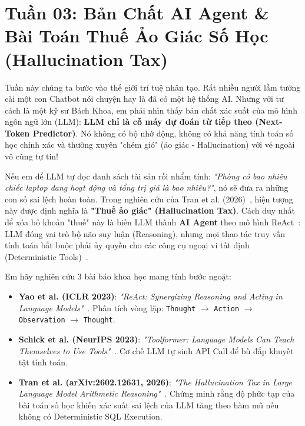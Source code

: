 ﻿\section{Tuần 03: Bản Chất AI Agent \& Bài Toán Thuế Ảo Giác Số Học (Hallucination Tax)}
\label{sec:tuan_03}

\begin{advisorbox}
Tuần này chúng ta bước vào thế giới trí tuệ nhân tạo. Rất nhiều người lầm tưởng cài một con Chatbot nói chuyện hay là đã có một hệ thống AI. Nhưng với tư cách là một kỹ sư Bách Khoa, em phải nhìn thấy bản chất xác suất của mô hình ngôn ngữ lớn (LLM): \textbf{LLM chỉ là cỗ máy dự đoán từ tiếp theo (Next-Token Predictor)}. Nó không có bộ nhớ động, không có khả năng tính toán số học chính xác và thường xuyên "chém gió" (ảo giác - Hallucination) với vẻ ngoài vô cùng tự tin!

Nếu em để LLM tự đọc danh sách tài sản rồi nhẩm tính: \textit{"Phòng có bao nhiêu chiếc laptop đang hoạt động và tổng trị giá là bao nhiêu?"}, nó sẽ đưa ra những con số sai lệch hoàn toàn. Trong nghiên cứu của Tran et al. (2026)~\cite{hallucinationtax2026}, hiện tượng này được định nghĩa là \textbf{"Thuế ảo giác" (Hallucination Tax)}. Cách duy nhất để xóa bỏ khoản "thuế" này là biến LLM thành \textbf{AI Agent} theo mô hình ReAct~\cite{yao2023react}: LLM đóng vai trò bộ não suy luận (Reasoning), nhưng mọi thao tác truy vấn tính toán bắt buộc phải ủy quyền cho các công cụ ngoại vi tất định (Deterministic Tools)~\cite{schick2023toolformer}.
\end{advisorbox}

\begin{literaturebox}
Em hãy nghiên cứu 3 bài báo khoa học mang tính bước ngoặt:
\begin{itemize}[leftmargin=1.5em]
    \item \textbf{Yao et al. (ICLR 2023)}: \textit{"ReAct: Synergizing Reasoning and Acting in Language Models"}~\cite{yao2023react}. Phân tích vòng lặp: \texttt{Thought} $\rightarrow$ \texttt{Action} $\rightarrow$ \texttt{Observation} $\rightarrow$ \texttt{Thought}.
    \item \textbf{Schick et al. (NeurIPS 2023)}: \textit{"Toolformer: Language Models Can Teach Themselves to Use Tools"}~\cite{schick2023toolformer}. Cơ chế LLM tự sinh API Call để bù đắp khuyết tật tính toán.
    \item \textbf{Tran et al. (arXiv:2602.12631, 2026)}: \textit{"The Hallucination Tax in Large Language Model Arithmetic Reasoning"}~\cite{hallucinationtax2026}. Chứng minh rằng độ phức tạp của bài toán số học khiến xác suất sai lệch của LLM tăng theo hàm mũ nếu không có Deterministic SQL Execution.
\end{itemize}
\end{literaturebox}

